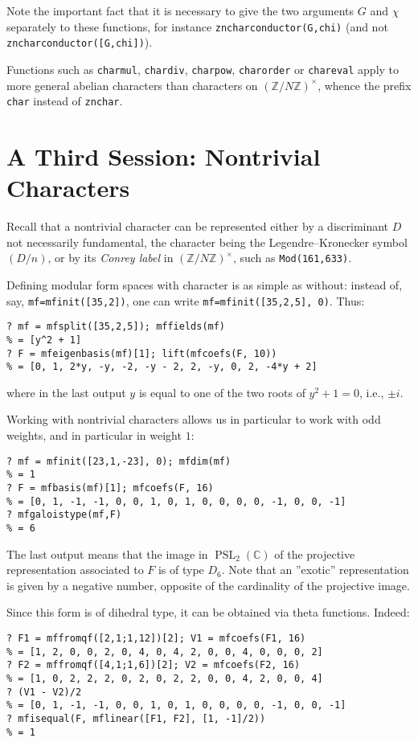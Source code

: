 \documentclass[11pt]{article}
\DeclareMathOperator{\PSL}{PSL}
\newcommand{\Z}{{\mathbb Z}}
\newcommand{\C}{{\mathbb C}}
\def\kbd#1{{\tt #1}}
\begin{document}
Note the important fact that it is necessary to give the two arguments $G$ and
$\chi$ separately to these functions, for instance \kbd{zncharconductor(G,chi)}
(and not \kbd{zncharconductor([G,chi])}).

Functions such as \kbd{charmul}, \kbd{chardiv}, \kbd{charpow},
\kbd{charorder} or \kbd{chareval} apply to more general abelian characters
than characters on $(\Z/N\Z)^\times$, whence the prefix \kbd{char} instead of
\kbd{znchar}.

\section{A Third Session: Nontrivial Characters}

Recall that a nontrivial character can be represented either by a discriminant
$D$ not necessarily fundamental, the character being the Legendre--Kronecker
symbol $(D/n)$, or by its \emph{Conrey label} in $(\Z/N\Z)^\times$, such as
\kbd{Mod(161,633)}.

Defining modular form spaces with character is as simple as without:
instead of, say, \kbd{mf=mfinit([35,2])}, one can write
\kbd{mf=mfinit([35,2,5], 0)}. Thus:

\begin{verbatim}
? mf = mfsplit([35,2,5]); mffields(mf)
% = [y^2 + 1]
? F = mfeigenbasis(mf)[1]; lift(mfcoefs(F, 10))
% = [0, 1, 2*y, -y, -2, -y - 2, 2, -y, 0, 2, -4*y + 2]
\end{verbatim}
where in the last output $y$ is equal to one of the two roots of $y^2+1=0$,
i.e., $\pm i$.

Working with nontrivial characters allows us in particular to work with odd
weights, and in particular in weight $1$:

\begin{verbatim}
? mf = mfinit([23,1,-23], 0); mfdim(mf)
% = 1
? F = mfbasis(mf)[1]; mfcoefs(F, 16)
% = [0, 1, -1, -1, 0, 0, 1, 0, 1, 0, 0, 0, 0, -1, 0, 0, -1]
? mfgaloistype(mf,F)
% = 6
\end{verbatim}

The last output means that the image in $\PSL_2(\C)$ of the projective
representation associated to $F$ is of type $D_6$. Note that an ''exotic''
representation is given by a negative number, opposite of the cardinality
of the projective image.

Since this form is of dihedral type, it can be obtained via theta functions.
Indeed:

\begin{verbatim}
? F1 = mffromqf([2,1;1,12])[2]; V1 = mfcoefs(F1, 16)
% = [1, 2, 0, 0, 2, 0, 4, 0, 4, 2, 0, 0, 4, 0, 0, 0, 2]
? F2 = mffromqf([4,1;1,6])[2]; V2 = mfcoefs(F2, 16)
% = [1, 0, 2, 2, 2, 0, 2, 0, 2, 2, 0, 0, 4, 2, 0, 0, 4]
? (V1 - V2)/2
% = [0, 1, -1, -1, 0, 0, 1, 0, 1, 0, 0, 0, 0, -1, 0, 0, -1]
? mfisequal(F, mflinear([F1, F2], [1, -1]/2))
% = 1
\end{verbatim}
\end{document}
